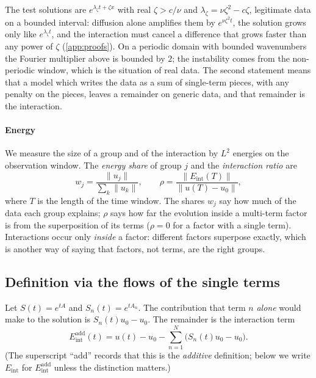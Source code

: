\documentclass[11pt]{article}
\theoremstyle{plain}
\theoremstyle{definition}
\theoremstyle{remark}
\newcommand{\Eint}{E_{\mathrm{int}}}        %
\newcommand{\norm}[1]{\lVert#1\rVert}
\newcommand{\roleinalg}[1]{\par\noindent\emph{Role in the algorithm.} #1\par}
\renewcommand{\roleinalg}[1]{}
\begin{document}
The test solutions are $e^{\lambda_\zeta t+\zeta x}$ with real $\zeta>c/\nu$ and $\lambda_\zeta=\nu\zeta^2-c\zeta$, legitimate
data on a bounded interval: diffusion alone amplifies them by $e^{\nu\zeta^2t}$, the solution grows only like
$e^{\lambda_\zeta t}$, and the interaction must cancel a difference that grows faster than any power of $\zeta$
(\cref{app:proofs}). On a periodic domain with bounded wavenumbers the Fourier multiplier above is bounded by
$2$; the instability comes from the non-periodic window, which is the situation of real data. The second
statement means that a model which writes the data as a sum of single-term pieces, with any penalty on the
pieces, leaves a remainder on generic data, and that remainder is the interaction.

\paragraph{Energy}
We measure the size of a group and of the interaction by $L^2$ energies on the observation window.
The \emph{energy share} of group $j$ and the \emph{interaction ratio} are
\begin{equation}\label{eq:energy}
  w_j=\frac{\norm{u_j}}{\sum_k\norm{u_k}},\qquad
  \rho=\frac{\norm{\Eint(T)}}{\norm{u(T)-u_0}} ,
\end{equation}
where $T$ is the length of the time window. The shares $w_j$ say how much of the data each group
explains; $\rho$ says how far the evolution inside a multi-term factor is from the superposition of its
terms ($\rho=0$ for a factor with a single term). Interactions occur only \emph{inside} a factor:
different factors superpose exactly, which is another way of saying that factors, not terms, are the
right groups.

\roleinalg{By \cref{prop:discont}, a value of $\Eint$ computed from one interpolated field on a
bounded window is not reliable. The algorithm reports the distribution of $\rho$ over posterior samples
(the companion algorithm paper), never a single number, and uses the shares $w_j$ with credible intervals.}



\subsection{Definition via the flows of the single terms}
Let $S(t)=e^{tA}$ and $S_n(t)=e^{tA_n}$. The contribution that term $n$ \emph{alone} would make to the solution is $S_n(t)u_0-u_0$. The remainder is the interaction term
\begin{equation}\label{xeq:eint-def}
\Eint^{\mathrm{add}}(t)=u(t)-u_0-\sum_{n=1}^N\big(S_n(t)u_0-u_0\big).
\end{equation}
(The superscript ``add'' records that this is the \emph{additive} definition; below we write $\Eint$ for $\Eint^{\mathrm{add}}$ unless the distinction matters.)
\end{document}
